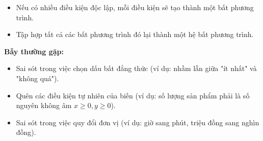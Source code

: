 \begin{phuongphap}
\begin{enumerate}
    \begin{itemize}
        \item Nếu có nhiều điều kiện độc lập, mỗi điều kiện sẽ tạo thành một bất phương trình.
        \item Tập hợp tất cả các bất phương trình đó lại thành một hệ bất phương trình.
    \end{itemize}
\end{enumerate}
\textbf{Bẫy thường gặp:}
\begin{itemize}
    \item Sai sót trong việc chọn dấu bất đẳng thức (ví dụ: nhầm lẫn giữa "ít nhất" và "không quá").
    \item Quên các điều kiện tự nhiên của biến (ví dụ: số lượng sản phẩm phải là số nguyên không âm $x \ge 0, y \ge 0$).
    \item Sai sót trong việc quy đổi đơn vị (ví dụ: giờ sang phút, triệu đồng sang nghìn đồng).
\end{itemize}
\end{phuongphap}
